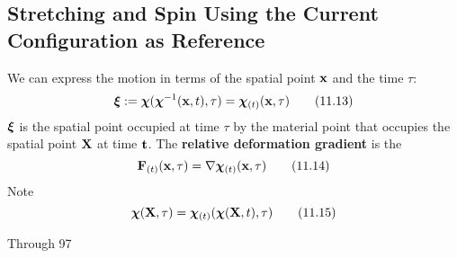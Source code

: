 \documentclass{article}
\newcommand{\Chi}{\boldsymbol{\chi}}
\begin{document}
\subsection{Stretching and Spin Using the Current Configuration as Reference}
We can express the motion in terms of the spatial point $\textbf{x}$ and the time $\tau$:
\[
	\boldsymbol{\xi} \eqdef \Chi(\Chi\inv(\x,t),\tau) = \Chi_{(t)}(\x,\tau)\tag{11.13}
\]
$\boldsymbol{\xi}$ is the spatial point occupied at time $\tau$ by the material point that occupies the spatial point $\textbf{X}$ at time $\textbf{t}$.
The \textbf{relative deformation gradient} is the
\[
	\F_{(t)}(\x,\tau) = \del\Chi_{(t)}(\x,\tau)\tag{11.14}
\]
Note
\[
	\Chi(\X,\tau) = \Chi_{(t)}(\Chi(\X,t),\tau)\tag{11.15}
\]






Through 97
\end{document}
